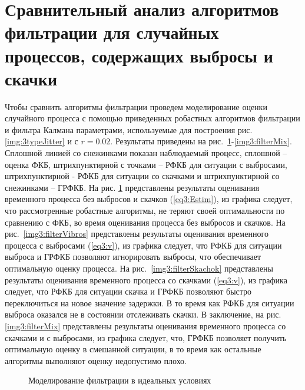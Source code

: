 \section{Сравнительный анализ алгоритмов фильтрации для случайных процессов, содержащих выбросы и скачки} \label{sect3_6}
Чтобы сравнить алгоритмы фильтрации проведем моделирование оценки случайного процесса с помощью приведенных робастных алгоритмов фильтрации и фильтра Калмана параметрами, используемые для построения рис. \ref{img:3typeJitter} и с $r=0.02$. 
Результаты приведены на рис. \ref{img3:filterIdeal}-\ref{img3:filterMix}. Сплошной линией со снежинками показан наблюдаемый процесс, сплошной – оценка ФКБ, штрихпунктирной с точками – РФКБ для ситуации с выбросами, штрихпунктирной - РФКБ для ситуации со скачками и штрихпунктирной со снежинками – ГРФКБ. На рис. \ref{img3:filterIdeal} представлены результаты оценивания временного процесса без выбросов и скачков (\ref{eq3:Estim}), из графика следует, что рассмотренные робастные алгоритмы, не теряют своей оптимальности по сравнению с ФКБ, во время оценивания процесса без выбросов и скачков.
На рис. \ref{img3:filterVibros} представлены результаты оценивания временного процесса с выбросами (\ref{eq3:v}), из графика следует, что РФКБ для ситуации выброса и ГРФКБ позволяют игнорировать выбросы, что обеспечивает оптимальную оценку процесса.
На рис. \ref{img3:filterSkachok} представлены результаты оценивания временного процесса со скачками (\ref{eq3:v}), из графика следует, что РФКБ для ситуации скачка и ГРФКБ позволяют быстро переключиться на новое значение задержки. В то время как РФКБ для ситуации выброса оказался не в состоянии отслеживать скачки.
В заключение, на рис. \ref{img3:filterMix} представлены результаты оценивания временного процесса со скачками и с выбросами, из графика следует, что, ГРФКБ позволяет получить оптимальную оценку в смешанной ситуации, в то время как остальные алгоритмы выполняют оценку недопустимо плохо.


\pgfplotsset{width=15cm, height=10cm, compat=1.3}
\begin{figure} [!h]
  \center
{}
\caption{Моделирование фильтрации в идеальных условиях}
  \label{img3:filterIdeal}
\end{figure}

